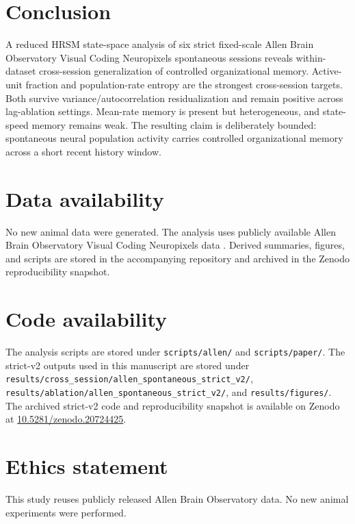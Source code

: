 \documentclass[11pt]{article}
\begin{document}
\section{Conclusion}

A reduced HRSM state-space analysis of six strict fixed-scale Allen Brain Observatory Visual Coding Neuropixels spontaneous sessions reveals within-dataset cross-session generalization of controlled organizational memory. Active-unit fraction and population-rate entropy are the strongest cross-session targets. Both survive variance/autocorrelation residualization and remain positive across lag-ablation settings. Mean-rate memory is present but heterogeneous, and state-speed memory remains weak. The resulting claim is deliberately bounded: spontaneous neural population activity carries controlled organizational memory across a short recent history window.

\section*{Data availability}

No new animal data were generated. The analysis uses publicly available Allen Brain Observatory Visual Coding Neuropixels data \citep{AllenBrainObservatoryVisualCodingNeuropixels}. Derived summaries, figures, and scripts are stored in the accompanying repository and archived in the Zenodo reproducibility snapshot.

\section*{Code availability}

The analysis scripts are stored under \texttt{scripts/allen/} and \texttt{scripts/paper/}. The strict-v2 outputs used in this manuscript are stored under \texttt{results/cross\_session/allen\_spontaneous\_strict\_v2/}, \texttt{results/ablation/allen\_spontaneous\_strict\_v2/}, and \texttt{results/figures/}. The archived strict-v2 code and reproducibility snapshot is available on Zenodo at \href{https://doi.org/10.5281/zenodo.20724425}{10.5281/zenodo.20724425}.

\section*{Ethics statement}

This study reuses publicly released Allen Brain Observatory data. No new animal experiments were performed.
\end{document}
